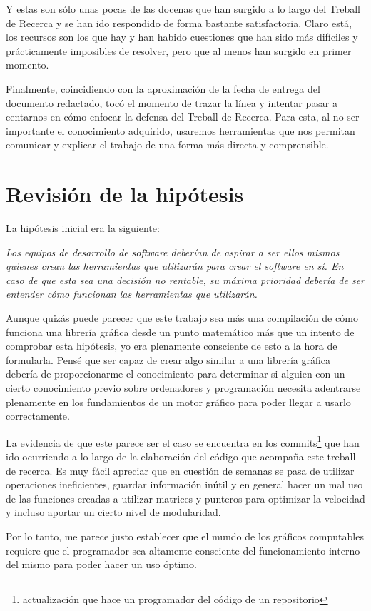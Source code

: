 Y estas son sólo unas pocas de las docenas que han surgido a lo largo del Treball de Recerca y se han ido respondido de forma bastante satisfactoria. Claro está, los recursos son los que hay y han habido cuestiones que han sido más difíciles y prácticamente imposibles de resolver, pero que al menos han surgido en primer momento.

Finalmente, coincidiendo con la aproximación de la fecha de entrega del documento redactado, tocó el momento de trazar la línea y intentar pasar a centarnos en cómo enfocar la defensa del Treball de Recerca. Para esta, al no ser importante el conocimiento adquirido, usaremos herramientas que nos permitan comunicar y explicar el trabajo de una forma más directa y comprensible.

\section{Revisión de la hipótesis}
La hipótesis inicial era la siguiente:

\textit{Los equipos de desarrollo de software deberían de aspirar a ser ellos mismos quienes crean las herramientas que utilizarán para crear el software en sí. En caso de que esta sea una decisión no rentable, su máxima prioridad debería de ser entender cómo funcionan las herramientas que utilizarán.}

Aunque quizás puede parecer que este trabajo sea más una compilación de cómo funciona una librería gráfica desde un punto matemático más que un intento de comprobar esta hipótesis, yo era plenamente consciente de esto a la hora de formularla. Pensé que ser capaz de crear algo similar a una librería gráfica debería de proporcionarme el conocimiento para determinar si alguien con un cierto conocimiento previo sobre ordenadores y programación necesita adentrarse plenamente en los fundamientos de un motor gráfico para poder llegar a usarlo correctamente.

La evidencia de que este parece ser el caso se encuentra en los commits\footnote{actualización que hace un programador del código de un repositorio} que han ido ocurriendo a lo largo de la elaboración del código que acompaña este treball de recerca. Es muy fácil apreciar que en cuestión de semanas se pasa de utilizar operaciones ineficientes, guardar información inútil y en general hacer un mal uso de las funciones creadas a utilizar matrices y punteros para optimizar la velocidad y incluso aportar un cierto nivel de modularidad.

Por lo tanto, me parece justo establecer que el mundo de los gráficos computables requiere que el programador sea altamente consciente del funcionamiento interno del mismo para poder hacer un uso óptimo.

